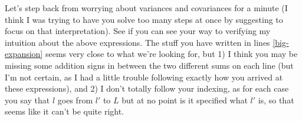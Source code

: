 \documentclass[a4paper,10pt]{article}
\begin{document}
    Let's step back from worrying about variances and covariances for a minute (I think I was trying to have you solve too many steps at once by suggesting to focus on that interpretation). See if you can see your way to verifying my intuition about the above expressions. The stuff you have written in lines \eqref{big-expansion} seems very close to what we're looking for, but 1) I think you may be missing some addition signs in between the two different sums on each line (but I'm not certain, as I had a little trouble following exactly how you arrived at these expressions), and 2) I don't totally follow your indexing, as for each case you say that $l$ goes from $l'$ to $L$ but at no point is it specified what $l'$ is, so that seems like it can't be quite right.


\end{document}
